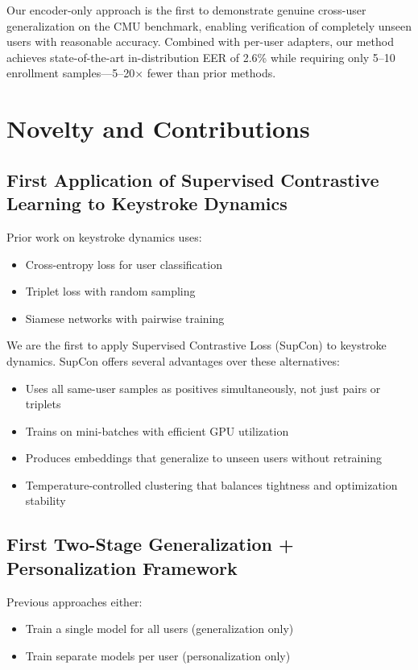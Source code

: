 \documentclass{ieeeaccess}
\begin{document}
{Our encoder-only approach is the first to demonstrate genuine cross-user generalization on the CMU benchmark, enabling verification of completely unseen users with reasonable accuracy. Combined with per-user adapters, our method achieves state-of-the-art in-distribution EER of 2.6\% while requiring only 5--10 enrollment samples---5--20$\times$ fewer than prior methods.

\section{Novelty and Contributions}
\label{sec:novelty}

\subsection{First Application of Supervised Contrastive Learning to Keystroke Dynamics}

Prior work on keystroke dynamics uses:
\begin{itemize}
\item Cross-entropy loss for user classification~\cite{b7,b13}
\item Triplet loss with random sampling~\cite{b21}
\item Siamese networks with pairwise training~\cite{b22}
\end{itemize}

We are the first to apply Supervised Contrastive Loss (SupCon) to keystroke dynamics. SupCon offers several advantages over these alternatives:
\begin{itemize}
\item Uses all same-user samples as positives simultaneously, not just pairs or triplets
\item Trains on mini-batches with efficient GPU utilization
\item Produces embeddings that generalize to unseen users without retraining
\item Temperature-controlled clustering that balances tightness and optimization stability
\end{itemize}

\subsection{First Two-Stage Generalization + Personalization Framework}

Previous approaches either:
\begin{itemize}
\item Train a single model for all users (generalization only)
\item Train separate models per user (personalization only)
\end{itemize}

}
\end{document}
